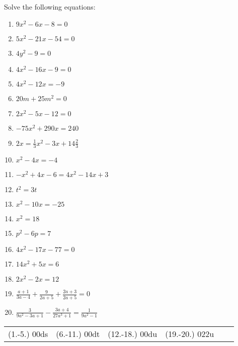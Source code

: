 \begin{exercises}{}
{Solve the following equations:
\begin{multicols}{2}
\begin{enumerate}[itemsep=5pt, label=\textbf{\arabic*}. ] 
\item  $9x^{2}-6x-8=0$%
\item  $5x^{2}-21x-54=0$%
\item  $4y^{2}-9=0$%
\item  $4x^{2}-16x-9=0$%
\item  $4x^{2}-12x=-9$%
\item  $20m+25{m}^{2}=0$
\item  $2{x}^{2}-5x-12=0$  
\item  $-75{x}^{2}+290x=240$
\item  $2x=\frac{1}{3}{x}^{2}-3x+14\frac{2}{3}$
\item  ${x}^{2}-4x=-4$      
\item  $-{x}^{2}+4x-6=4{x}^{2}-14x+3$       
\item  ${t}^{2}=3t$  
\item  ${x}^{2}-10x=-25$      
\item  ${x}^{2}=18$
\item  ${p}^{2}-6p=7$
\item  $4{x}^{2}-17x-77=0$
\item  $14{x}^{2}+5x=6$
\item  $2{x}^{2}-2x=12$  
\item  $\frac{a+1}{3a-4}+\frac{9}{2a+5}+\frac{2a+3}{2a+5}=0$
\item  $\frac{3}{9a^2-3a+1}-\frac{3a+4}{27a^3+1}=\frac{1}{9a^2-1}$          
\end{enumerate}
\end{multicols}
\practiceinfo
\par 
\par\begin{tabular}[h]{cccccc}
(1.-5.) 00ds&  (6.-11.) 00dt&  (12.-18.) 00du & (19.-20.) 022u &\end{tabular}
}
\end{exercises}
